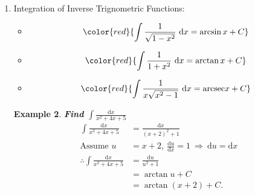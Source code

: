 \documentclass[12pt, a4paper]{article}
\newtheorem{example}{Example}[subsection]
\begin{document}
\begin{enumerate}
\begin{example}
        $$\begin{aligned}
            \therefore\int 2x(x^2+3)^5\ \mathrm{d}x&=\int (x^2+3)^5\cdot (2x\cdot\mathrm{d}x)\\
            &=\int u^5\ \mathrm{d}u\\
            &=\frac{1}{6}u^6+C\\
            &=\frac{1}{6}(x^2+3)^6+C.
        \end{aligned}$$
    \end{example}
    \item Integration of Inverse Trignometric Functions: 
    \begin{itemize}
        \item $${\color{red}{\int \frac{1}{\sqrt{1-x^2}}\ \mathrm{d}x=\arcsin x+C}}$$
        \item $${\color{red}{\int \frac{1}{1+x^2}\ \mathrm{d}x=\arctan x+C}}$$
        \item $${\color{red}{\int \frac{1}{x\sqrt{x^2-1}}\ \mathrm{d}x=\text{arcsec} x+C}}$$
    \end{itemize}
    \begin{example}
        \textbf{Find $\int \frac{\mathrm{d}x}{x^2+4x+5}$}
        $$\begin{aligned}
            \int \frac{\mathrm{d}x}{x^2+4x+5}&=\frac{\mathrm{d}x}{(x+2)^2+1}\\
            \text{Assume }u&=x+2,\ \frac{\mathrm{d}u}{\mathrm{d}x}=1\ \Rightarrow\ \mathrm{d}u=\mathrm{d}x\\
            \therefore  \int \frac{\mathrm{d}x}{x^2+4x+5}&=\frac{\mathrm{d}u}{u^2+1}\\
            &=\arctan u+C\\
            &=\arctan (x+2)+C.
        \end{aligned}$$
    \end{example}
\end{enumerate}
\end{document}
